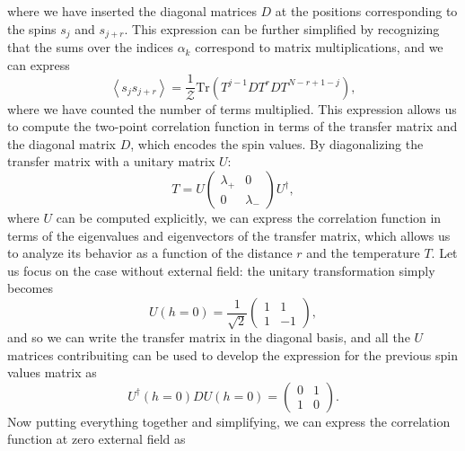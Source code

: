 where we have inserted the diagonal matrices \(D\) at the positions corresponding to the spins \(s_j\) and \(s_{j+r}\). This expression can be further simplified by recognizing that the sums over the indices \(\alpha_k\) correspond to matrix multiplications, and we can express
\[
    \left\langle s_j s_{j+r} \right\rangle = \frac{1}{\mathcal{Z}} \text{Tr}(T^{j-1} D T^{r} D T^{N-r+1-j}),
\]
where we have counted the number of terms multiplied. This expression allows us to compute the two-point correlation function in terms of the transfer matrix and the diagonal matrix \(D\), which encodes the spin values. By diagonalizing the transfer matrix with a unitary matrix \(U\):
\[
    T = U \begin{pmatrix}
        \lambda_+ & 0         \\
        0         & \lambda_-
    \end{pmatrix} U^{\dagger},
\]
where \(U\) can be computed explicitly, we can express the correlation function in terms of the eigenvalues and eigenvectors of the transfer matrix, which allows us to analyze its behavior as a function of the distance \(r\) and the temperature \(T\). Let us focus on the case without external field: the unitary transformation simply becomes
\[
    U(h=0) = \frac{1}{\sqrt{2}} \begin{pmatrix}
        1 & 1  \\
        1 & -1
    \end{pmatrix},
\]
and so we can write the transfer matrix in the diagonal basis, and all the \(U\) matrices contribuiting can be used to develop the expression for the previous spin values matrix as
\[
    U^{\dagger}(h=0) D U(h=0) = \begin{pmatrix}
        0 & 1 \\
        1 & 0
    \end{pmatrix}.
\]
Now putting everything together and simplifying, we can express the correlation function at zero external field as
